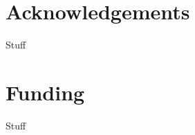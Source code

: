 \documentclass{bioinfo}
\begin{document}
\section*{Acknowledgements}

Stuff


\section*{Funding}

Stuff


%
%
%
%
%
%
%
%


%

\end{document}
